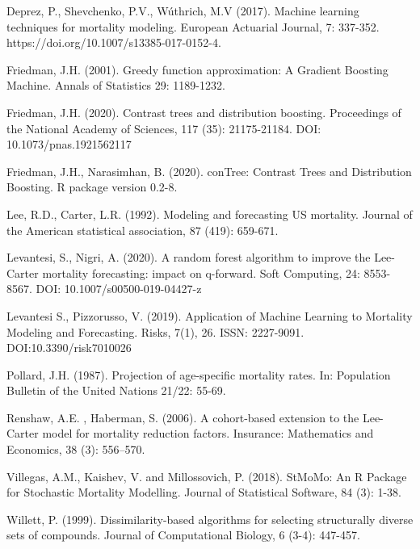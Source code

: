 \documentclass[fleqn,10pt]{wlscirep}
\begin{document}
\begin{thebibliography}{99}
Deprez, P., Shevchenko, P.V., W\'uthrich, M.V (2017). Machine learning techniques for mortality modeling. European Actuarial Journal, 7: 337-352. https://doi.org/10.1007/s13385-017-0152-4.

Friedman, J.H. (2001). Greedy function approximation: A Gradient Boosting Machine. Annals of Statistics 29: 1189-1232.

Friedman, J.H. (2020). Contrast trees and distribution boosting. Proceedings of the National Academy of Sciences, 117 (35): 21175-21184. DOI: 10.1073/pnas.1921562117

Friedman, J.H., Narasimhan, B. (2020). conTree: Contrast Trees and Distribution Boosting. R package version 0.2-8.

Lee, R.D., Carter, L.R. (1992). Modeling and forecasting US mortality. Journal of the American statistical association, 87 (419): 659-671.

Levantesi, S., Nigri, A. (2020). A random forest algorithm to improve the Lee-Carter mortality forecasting: impact on q-forward. Soft Computing, 24: 8553-8567. DOI: 10.1007/s00500-019-04427-z

Levantesi S., Pizzorusso, V. (2019). Application of Machine Learning to Mortality Modeling and Forecasting. Risks, 7(1), 26. ISSN: 2227-9091. DOI:10.3390/risk7010026

Pollard, J.H. (1987). Projection of age-specific mortality rates. In: Population Bulletin of the United Nations 21/22: 55-69.

Renshaw, A.E. , Haberman, S. (2006). A cohort-based extension to the Lee-Carter model for mortality reduction factors. Insurance: Mathematics and Economics, 38 (3): 556–570.

Villegas, A.M., Kaishev, V. and Millossovich, P. (2018). StMoMo: An R Package for Stochastic Mortality Modelling. Journal of Statistical Software, 84 (3): 1-38.

Willett, P. (1999). Dissimilarity-based algorithms for selecting structurally diverse sets of compounds. Journal of Computational Biology, 6 (3-4): 447-457.
 
\end{thebibliography}
\end{document}
